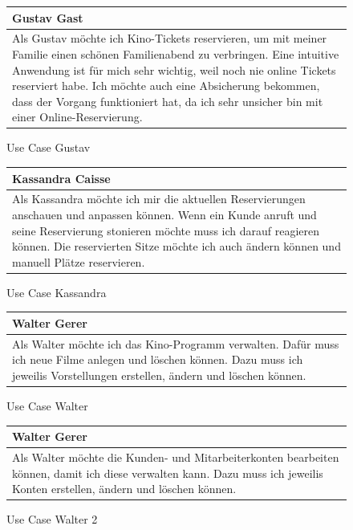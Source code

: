 		\begin{figure}[H]
			\begin{tabular}{p{13cm}}
				\textbf{Gustav Gast} \\\toprule
				Als Gustav möchte ich Kino-Tickets reservieren, um mit meiner Familie einen schönen Familienabend zu verbringen. Eine intuitive Anwendung ist für mich sehr wichtig, weil noch nie online Tickets reserviert habe. Ich möchte auch eine Absicherung bekommen, dass der Vorgang funktioniert hat, da ich sehr unsicher bin mit einer Online-Reservierung.
			\end{tabular}
			\caption[Use Case Gustav]{\label{fig:useCaseGustav} Use Case Gustav}
		\end{figure}
	
		\begin{figure}[H]
			\begin{tabular}{p{13cm}}
				\textbf{Kassandra Caisse} \\\toprule
				Als Kassandra möchte ich mir die aktuellen Reservierungen anschauen und anpassen können. Wenn ein Kunde anruft und seine Reservierung stonieren möchte muss ich darauf reagieren können. Die reservierten Sitze möchte ich auch ändern können und manuell Plätze reservieren.
			\end{tabular}
			\caption[Use Case Kassandra]{\label{fig:useCaseKassandra} Use Case Kassandra}
		\end{figure}

		\begin{figure}[H]
			\begin{tabular}{p{13cm}}
				\textbf{Walter Gerer} \\\toprule
				Als Walter möchte ich das Kino-Programm verwalten. Dafür muss ich neue Filme anlegen und löschen können. Dazu muss ich jeweilis Vorstellungen erstellen, ändern und löschen können. 
			\end{tabular}
			\caption[Use Case Walter]{\label{fig:useCaseWalter} Use Case Walter}
		\end{figure}
	
		\begin{figure}[H]
			\begin{tabular}{p{13cm}}
				\textbf{Walter Gerer} \\\toprule
				Als Walter möchte die Kunden- und Mitarbeiterkonten bearbeiten können, damit ich diese verwalten kann. Dazu muss ich jeweilis Konten erstellen, ändern und löschen können. 
			\end{tabular}
			\caption[Use Case Walter 2]{\label{fig:useCaseWalter2} Use Case Walter 2}
		\end{figure}
		
